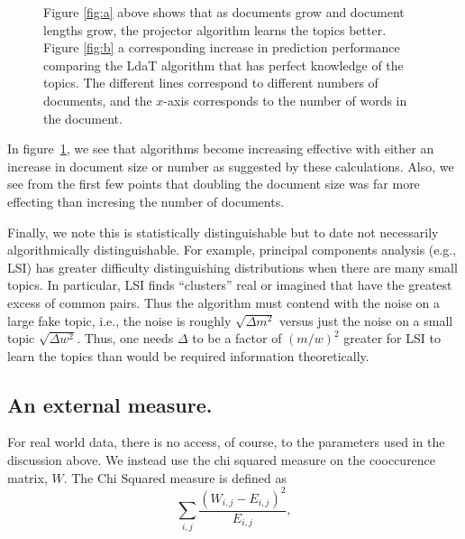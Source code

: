 \begin{figure}
     \begin{center}



    \end{center}
    \caption{Figure \ref{fig:a} above shows that as documents grow and document lengths grow, the projector algorithm
learns the topics better.  Figure \ref{fig:b} a corresponding increase in prediction performance comparing the LdaT algorithm that has perfect knowledge of the topics.  The different lines correspond to different numbers of documents, and the $x$-axis corresponds to the number of words in the document.}
   \label{fig:size-matters}
\end{figure}



In figure~\ref{fig:size-matters}, we see that algorithms become
increasing effective with either an increase in document size or
number as suggested by these calculations.  Also, we see from
the first few points that doubling the document size
was far more effecting than incresing the number of documents.

Finally, we note this is statistically distinguishable but to date not
necessarily algorithmically distinguishable.  For example, principal
components analysis (e.g., LSI) has greater difficulty distinguishing
distributions when there are many small topics.  In particular, LSI
finds ``clusters'' real or imagined that have the greatest excess of
common pairs.  Thus the algorithm must contend with the noise on a
large fake topic, i.e., the noise is roughly $\sqrt{ \Delta m^2}$
versus just the noise on a small topic $\sqrt{\Delta w^2}$.  Thus, one
needs $\Delta$ to be a factor of $(m/w)^2$ greater for LSI to learn
the topics than would be required information theoretically.




\subsection{An external measure.}


For real world data, there is no access, of course, to the parameters
used in the discussion above. We instead use the chi squared measure on
the cooccurence matrix, $W$.  The Chi Squared measure  is defined as $$\sum_{i,j} \frac{(W_{i,j} -
E_{i,j})^2}{E_{i,j}},$$

